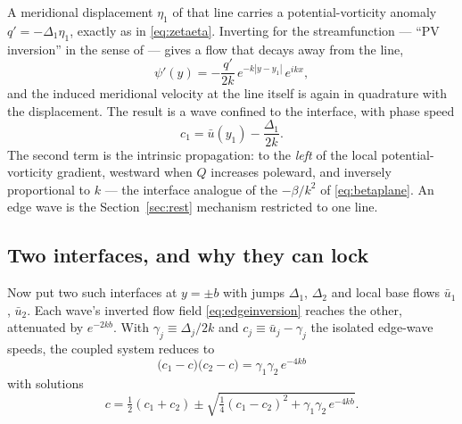 \documentclass[11pt,a4paper]{article}
\begin{document}
A meridional displacement $\eta_1$ of that line carries a potential-vorticity
anomaly $q' = -\Delta_1\eta_1$, exactly as in \eqref{eq:zetaeta}. Inverting for
the streamfunction --- ``PV inversion'' in the sense of
\citet{hoskins1985} --- gives a flow that decays away from the line,
%
\begin{equation}
\psi'(y) = -\frac{q'}{2k}\,e^{-k|y-y_1|}\,e^{ikx} ,
\label{eq:edgeinversion}
\end{equation}
%
and the induced meridional velocity at the line itself is again in quadrature
with the displacement. The result is a wave confined to the interface, with
phase speed
%
\begin{equation}
c_1 = \bar u(y_1) - \frac{\Delta_1}{2k} .
\label{eq:edgespeed}
\end{equation}
%
The second term is the intrinsic propagation: to the \emph{left} of the local
potential-vorticity gradient, westward when $Q$ increases poleward, and
inversely proportional to $k$ --- the interface analogue of the $-\beta/k^2$ of
\eqref{eq:betaplane}. An edge wave is the Section~\ref{sec:rest} mechanism
restricted to one line.

\subsection{Two interfaces, and why they can lock}

Now put two such interfaces at $y = \pm b$ with jumps $\Delta_1$, $\Delta_2$ and
local base flows $\bar u_1$, $\bar u_2$. Each wave's inverted flow field
\eqref{eq:edgeinversion} reaches the other, attenuated by $e^{-2kb}$. With
$\gamma_j \equiv \Delta_j/2k$ and $c_j \equiv \bar u_j - \gamma_j$ the isolated
edge-wave speeds, the coupled system reduces to
%
\begin{equation}
\boxed{\;\big(c_1 - c\big)\big(c_2 - c\big)
 = \gamma_1\gamma_2\,e^{-4kb}\;}
\label{eq:crw}
\end{equation}
%
with solutions
%
\begin{equation}
c = \tfrac12(c_1 + c_2) \pm
  \sqrt{\tfrac14(c_1-c_2)^2 + \gamma_1\gamma_2\,e^{-4kb}} .
\label{eq:crwroots}
\end{equation}
\end{document}
